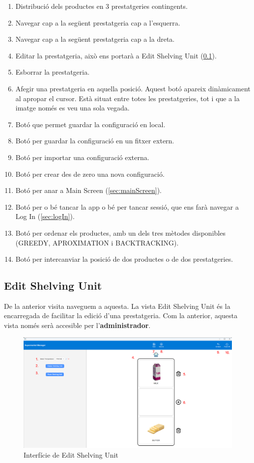 \documentclass[a4paper,12pt]{article}
\begin{document}
	\begin{enumerate}[itemsep=0pt, topsep=0pt]
		\item Distribució dels productes en 3 prestatgeries contingents.
		\item Navegar cap a la següent prestatgeria cap a l'esquerra.
		\item Navegar cap a la següent prestatgeria cap a la dreta.
		\item Editar la prestatgeria, això ens portarà a Edit Shelving Unit (\ref{sec:editShelvingUnit}).
		\item Esborrar la prestatgeria.
		\item Afegir una prestatgeria en aquella posició. Aquest botó apareix dinàmicament al apropar el cursor. Està situat entre totes les prestatgeries, tot i que a la imatge només es veu una sola vegada.
		\item Botó que permet guardar la configuració en local.
		\item Botó per guardar la configuració en un fitxer extern.
		\item Botó per importar una configuració externa.
		\item Botó per crear des de zero una nova configuració.
		\item Botó per anar a Main Screen (\ref{sec:mainScreen}).
		\item Botó per o bé tancar la app o bé per tancar sessió, que ens farà navegar a Log In (\ref{sec:logIn}).
		\item Botó per ordenar els productes, amb un dels tres mètodes disponibles (GREEDY, APROXIMATION i BACKTRACKING).
		\item Botó per intercanviar la posició de dos productes o de dos prestatgeries.
	\end{enumerate}
	
	\newpage
	\subsection{Edit Shelving Unit}
	\label{sec:editShelvingUnit}
	
	De la anterior visita naveguem a aquesta. La vista Edit Shelving Unit és la encarregada de facilitar la edició d'una prestatgeria. Com la anterior, aquesta vista només serà accesible per l'\textbf{administrador}.
	
	\begin{figure}[H] 
		\centering
		\includegraphics[width=0.75\linewidth]{assets/editshelvingunit.png}
		\caption{Interfície de Edit Shelving Unit}
	\end{figure}
	
\end{document}
